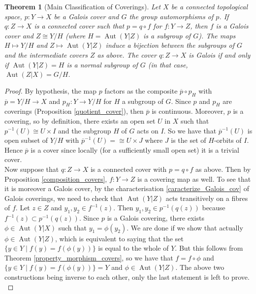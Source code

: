 \documentclass{article}
\theoremstyle{plain}
\newtheorem{theorem}{Theorem}[subsection]
\theoremstyle{definition}
\DeclareMathOperator{\Aut}{Aut}
\begin{document}
\begin{theorem}[Main Classification of Coverings]
\label{clasification_of_covers}
    Let $X$ be a connected topological space, $p:Y\rightarrow X$ be a Galois cover and $G$ the group automorphisms of $p$. 
    If $q:Z\rightarrow X$ is a connected cover such that $p = q\circ f$ for $f:Y\rightarrow Z$, then $f$ is a Galois cover and $Z\cong Y/H$ (where $H=\Aut(Y|Z)$ is a subgroup of $G$).
    The maps $H\mapsto Y/H$ and $Z\mapsto \Aut(Y|Z)$ induce a bijection between the subgroups of $G$ and the intermediate covers $Z$ as above.
    The cover $q:Z\rightarrow X$ is Galois if and only if $\Aut(Y|Z)=H$ is a normal subgroup of $G$ (in that case, $\Aut(Z|X) = G /H$.
\end{theorem}
\begin{proof} 
    By hypothesis, the map $p$ factors as the composite $\overline{p}\circ p_H$ with $\overline{p}= Y/H\rightarrow X$ and $p_H:Y\rightarrow Y/H$ for $H$ a subgroup of $G$.
    Since $p$ and $p_H$ are coverings (Proposition \ref{quotient_cover}), then $\overline{p}$ is continuous.
    Moreover, $p$ is a covering, so by definition, there exists an open set $U$ in $X$ such that $p^{-1}(U) \cong U\times I$ and the subgroup $H$ of $G$ acts on $I$.
    So we have that $\overline{p}^{-1}(U)$ is open subset of $Y/H$ with $\overline{p}^{-1}(U)=\cong U\times J$ where $J$ is the set of $H$-orbits of $I$.
    Hence $\overline{p}$ is a cover since locally (for a sufficiently small open set) it is a trivial cover.\\
    Now suppose that $q:Z\rightarrow X$ is a connected cover with $p=q\circ f$ as above. Then by Proposition \ref{composition_covers}, $f:Y\rightarrow Z$ is a covering map as well. 
    To see that it is moreover a Galois cover, by the characterisation \ref{caracterize_Galois_cov} of Galois coverings, we need to check that $\Aut(Y|Z)$ acts transitively on a fibres of $f$.
    Let $z\in Z$ and $y_1,y_2\in f^{-1}(z)$. 
    Then $y_1,y_2\in p^{-1}(q(z))$ because $f^{-1}(z) \subset p^{-1}( q(z))$.
    Since $p$ is a Galois covering, there exists $\phi\in\Aut(Y|X)$ such that $y_1 = \phi(y_2)$. 
    We are done if we show that actually $\phi\in\Aut(Y|Z)$, which is equivalent to saying that the set $\{y\in Y \mid f(y)=f(\phi(y))\}$ is equal to the whole of $Y$.
    But this follows from Theorem \ref{property_morphism_covers}, so we have that $f = f\circ\phi$ and $\{y\in Y \mid f(y)=f(\phi(y))\} = Y$ and $\phi\in \Aut(Y|Z)$.
    The above two constructions being inverse to each other, only the last statement is left to prove.\\

\end{proof}
\end{document}
